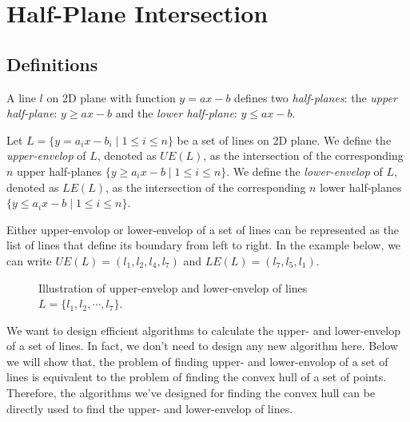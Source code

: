 \setcounter{definition}{0} \setcounter{property}{0} \setcounter{claim}{0} \setcounter{fact}{0} \setcounter{corollary}{0} \setcounter{figure}{0}
\section{Half-Plane Intersection}

\subsection*{Definitions}

\begin{definition}
A line $l$ on 2D plane with function $y = ax - b$ defines two \emph{half-planes}:
the \emph{upper half-plane}: $y \ge ax -b$ and the \emph{lower half-plane}: $y \le ax -b$.
\end{definition}

\begin{definition}
Let $L = \{y = a_i x - b_i \mid 1 \le i \le n \}$ be a set of lines on 2D plane.
We define the \emph{upper-envelop} of $L$, denoted as $UE(L)$, as the intersection of
the corresponding $n$ upper half-planes $\{y \ge a_i x -b \mid 1 \le i \le n \}$.
We define the \emph{lower-envelop} of $L$, denoted as $LE(L)$, as the intersection of
the corresponding $n$ lower half-planes $\{y \le a_i x -b \mid 1 \le i \le n \}$.
\end{definition}

Either upper-envolop or lower-envelop of a set of lines can be represented
as the list of lines that define its boundary from left to right. In the example
below, we can write $UE(L) = (l_1, l_2, l_4, l_7)$
and $LE(L) = (l_7, l_5, l_1)$.

\begin{figure}[h!]
\centering{}
\caption{Illustration of upper-envelop and lower-envelop of lines $L = \{l_1, l_2, \cdots, l_7\}$.}
\end{figure}

We want to design efficient algorithms to calculate the upper- and lower-envelop of a set of lines.
In fact, we don't need to design any new algorithm here. Below we will show that, the problem of finding
upper- and lower-envolop of a set of lines is equivalent to the problem of finding the convex hull
of a set of points. Therefore, the algorithms we've designed for finding the convex hull can be
directly used to find the upper- and lower-envelop of lines.


